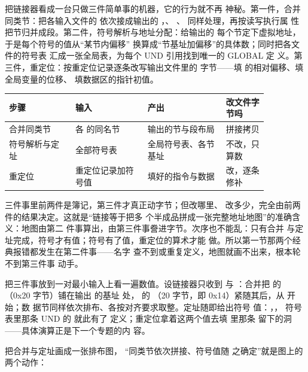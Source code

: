 把链接器看成一台只做三件简单事的机器，它的行为就不再
神秘。第一件，合并同类节：把各输入文件的 
依次接成输出的 ，、
、 同样处理，再按读写执行属
性把节归并成段。第二件，符号解析与地址分配：给输出的
每个节定下虚拟地址，于是每个符号的值从“某节内偏移”
换算成“节基址加偏移”的具体数；同时把各文件的符号表
汇成一张全局表，为每个 UND 引用找到唯一的 GLOBAL 定
义。第三件，重定位：按重定位记录逐条改写输出文件里的
字节——填  的相对偏移、填全局变量的位移、
填数据区的指针初值。

\begin{longtable}{L{0.22\linewidth}L{0.24\linewidth}L{0.26\linewidth}L{0.14\linewidth}}
\toprule
步骤 & 输入 & 产出 & 改文件字节吗 \\
\midrule
合并同类节 & 各  的同名节 & 输出的节与段布局 & 拼接拷贝 \\
符号解析与定址 & 全部符号表 & 全局符号表、各节基址 & 不改，只算数 \\
重定位 & 重定位记录加符号值 & 填好的指令与数据 & 改，逐条修补 \\
\bottomrule
\end{longtable}

三件事里前两件是簿记，第三件才真正动字节；但改哪里、
改多少，完全由前两件的结果决定。这就是“链接等于把多
个半成品拼成一张完整地址地图”的准确含义：地图由第二
件事算出，由第三件事誊进字节。次序也不能乱：只有合并
与定址完成，符号才有值；符号有了值，重定位的算术才能
做。所以第一节那两个经典报错都发生在第二件事——名字
查不到或重复定义，地图就画不出来，根本轮不到第三件事
动手。

把三件事放到一对最小输入上看一遍数值。设链接器只收到
 与 ：合并把  的
（0x20 字节）铺在输出  的基址
 处， 的 （20
字节，即 0x14）紧随其后，从  开始；数
据节同样依次排布、各按对齐要求取整。定址随即给出符号
值：，，
 符号表里那条 UND 的  就此有了
定义；重定位拿着这两个值去填  里那条
 留下的洞——具体演算正是下一个专题的内
容。

把合并与定址画成一张排布图，
“同类节依次拼接、符号值随
之确定”就是图上的两个动作：

